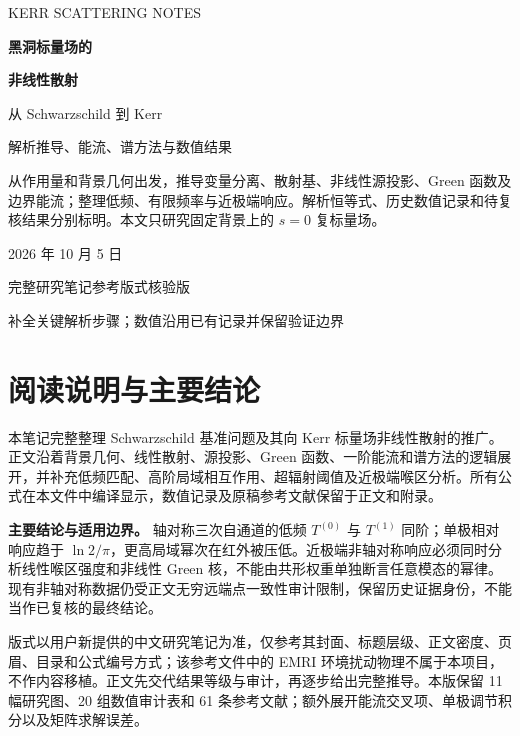 \documentclass[UTF8,fontset=fandol,11pt,a4paper,oneside]{ctexart}
\numberwithin{equation}{section}
\begin{document}
\hypersetup{pageanchor=false}
\begin{titlepage}\centering\vspace*{28mm}
{\small\color{ink} KERR SCATTERING NOTES\par}\vspace{18mm}
{\Huge\bfseries 黑洞标量场的\par}\vspace{9mm}
{\Huge\bfseries 非线性散射\par}\vspace{13mm}
{\Large 从 Schwarzschild 到 Kerr\par}\vspace{8mm}
{\large 解析推导、能流、谱方法与数值结果\par}\vspace{16mm}
\begin{minipage}{0.86\textwidth}\begin{note}
从作用量和背景几何出发，推导变量分离、散射基、非线性源投影、Green 函数及边界能流；整理低频、有限频率与近极端响应。解析恒等式、历史数值记录和待复核结果分别标明。本文只研究固定背景上的 $s=0$ 复标量场。
\end{note}\end{minipage}
\vfill{\normalsize 2026 年 10 月 5 日\par}\vspace{4mm}
{\small 完整研究笔记\quad 参考版式核验版\par}\vspace{2mm}
{\small 补全关键解析步骤；数值沿用已有记录并保留验证边界\par}
\end{titlepage}
\hypersetup{pageanchor=true}
\section*{阅读说明与主要结论}
本笔记完整整理 Schwarzschild 基准问题及其向 Kerr 标量场非线性散射的推广。正文沿着背景几何、线性散射、源投影、Green 函数、一阶能流和谱方法的逻辑展开，并补充低频匹配、高阶局域相互作用、超辐射阈值及近极端喉区分析。所有公式在本文件中编译显示，数值记录及原稿参考文献保留于正文和附录。
\begin{note}
\textbf{主要结论与适用边界。} 轴对称三次自通道的低频 $T^{(0)}$ 与 $T^{(1)}$ 同阶；单极相对响应趋于 $\ln2/\pi$，更高局域幂次在红外被压低。近极端非轴对称响应必须同时分析线性喉区强度和非线性 Green 核，不能由共形权重单独断言任意模态的幂律。现有非轴对称数据仍受正文无穷远端点一致性审计限制，保留历史证据身份，不能当作已复核的最终结论。
\end{note}
版式以用户新提供的中文研究笔记为准，仅参考其封面、标题层级、正文密度、页眉、目录和公式编号方式；该参考文件中的 EMRI 环境扰动物理不属于本项目，不作内容移植。正文先交代结果等级与审计，再逐步给出完整推导。本版保留 11 幅研究图、20 组数值审计表和 61 条参考文献；额外展开能流交叉项、单极调节积分以及矩阵求解误差。
\tableofcontents
\clearpage
\end{document}

